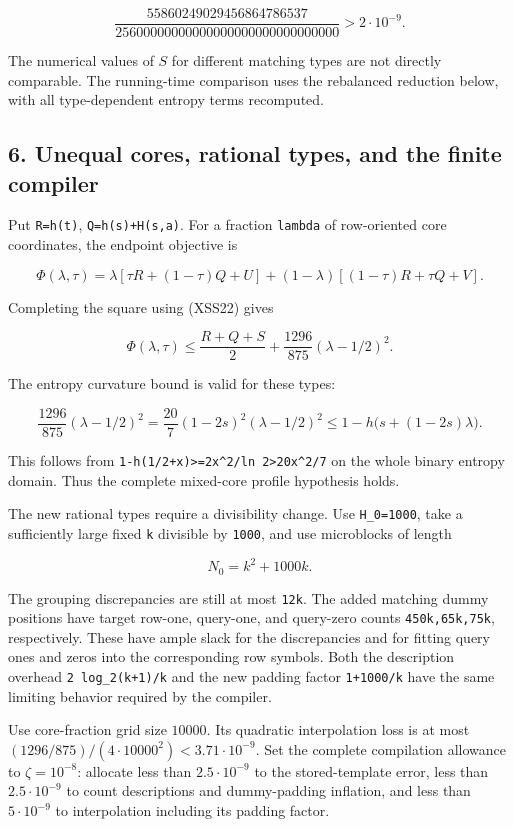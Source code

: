 \[
\frac{55860249029456864786537}
 {25600000000000000000000000000000}>2\cdot10^{-9}.
\]

The numerical values of \(S\) for different matching types are not directly comparable. The running-time comparison uses the rebalanced reduction below, with all type-dependent entropy terms recomputed.

\hypertarget{af-a9ec399514-unequal-cores-rational-types-and-the-finite-compiler}{%
\subsection{6. Unequal cores, rational types, and the finite compiler}\label{af-a9ec399514-unequal-cores-rational-types-and-the-finite-compiler}}

Put \texttt{R=h(t)}, \texttt{Q=h(s)+H(s,a)}. For a fraction \texttt{lambda} of row-oriented core coordinates, the endpoint objective is

\[
\Phi(\lambda,\tau)=
 \lambda[\tau R+(1-\tau)Q+U]
 +(1-\lambda)[(1-\tau)R+\tau Q+V].
\]

Completing the square using (XSS22) gives

\[
\Phi(\lambda,\tau)\le\frac{R+Q+S}{2}
 +\frac{1296}{875}(\lambda-1/2)^2.
 \tag{XSS25}
\]

The entropy curvature bound is valid for these types:

\[
\frac{1296}{875}(\lambda-1/2)^2
 =\frac{20}{7}(1-2s)^2(\lambda-1/2)^2
 \le1-h\bigl(s+(1-2s)\lambda\bigr).
 \tag{XSS26}
\]

This follows from \texttt{1-h(1/2+x)\textgreater{}=2x\^{}2/ln\ 2\textgreater{}20x\^{}2/7} on the whole binary entropy domain. Thus the complete mixed-core profile hypothesis holds.

The new rational types require a divisibility change. Use \texttt{H\_0=1000}, take a sufficiently large fixed \texttt{k} divisible by \texttt{1000}, and use microblocks of length

\[
N_0=k^2+1000k.
\]

The grouping discrepancies are still at most \texttt{12k}. The added matching dummy positions have target row-one, query-one, and query-zero counts \texttt{450k,65k,75k}, respectively. These have ample slack for the discrepancies and for fitting query ones and zeros into the corresponding row symbols. Both the description overhead \texttt{2\ log\_2(k+1)/k} and the new padding factor \texttt{1+1000/k} have the same limiting behavior required by the compiler.

Use core-fraction grid size \(10000\). Its quadratic interpolation loss is at most \((1296/875)/(4\cdot10000^2)<3.71\cdot10^{-9}\). Set the complete compilation allowance to \(\zeta=10^{-8}\): allocate less than \(2.5\cdot10^{-9}\) to the stored-template error, less than \(2.5\cdot10^{-9}\) to count descriptions and dummy-padding inflation, and less than \(5\cdot10^{-9}\) to interpolation including its padding factor.

